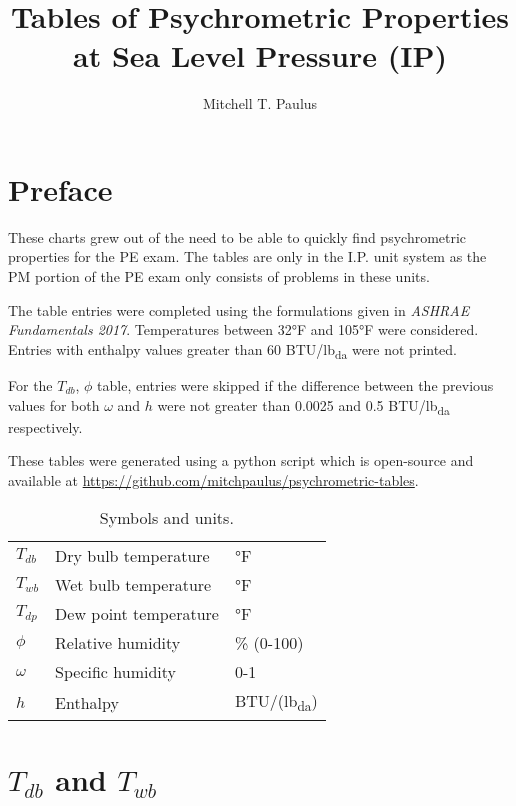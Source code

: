 \documentclass{book}
\title{Tables of Psychrometric Properties at Sea Level Pressure (IP)}
\author{Mitchell T. Paulus}
\newcommand{\tdb}{\(T_{db}\)}
\newcommand{\twb}{\(T_{wb}\)}
\newcommand{\tdp}{\(T_{dp}\)}
\newcommand{\rh}{\(\phi\)}
\newcommand{\spechum}{\(\omega\)}
\newcommand{\enthalpy}{\(h\)}
\begin{document}

\maketitle{}

\tableofcontents{}

\chapter{Preface}

These charts grew out of the need to be able to quickly find
psychrometric properties for the PE exam. The tables are only in the
I.P. unit system as the PM portion of the PE exam only consists of
problems in these units.

The table entries were completed using the formulations given in
\textit{ASHRAE Fundamentals 2017}. Temperatures between 32°F and 105°F
were considered. Entries with enthalpy values greater than 60
BTU/lb\textsubscript{da}
were not printed.

For the \tdb{}, \rh{} table, entries were skipped if the difference
between the previous values for both \spechum{} and \enthalpy{} were not
greater than 0.0025 and 0.5 BTU/lb\textsubscript{da} respectively.

These tables were generated using a python script which is open-source
and available at \url{https://github.com/mitchpaulus/psychrometric-tables}.

\begin{table}
\centering
\caption{Symbols and units.}
\label{tab:}
\begin{tabular}{lll}
\toprule
    \tdb & Dry bulb temperature & °F \\
    \twb & Wet bulb temperature & °F \\
    \tdp & Dew point temperature & °F \\
    \rh & Relative humidity & \% (0-100) \\
    \spechum & Specific humidity & 0-1 \\
    \enthalpy & Enthalpy & BTU/(lb\textsubscript{da}) \\
\end{tabular}

\end{table}

\chapter{\(T_{db}\) and \(T_{wb}\) }
\end{document}
